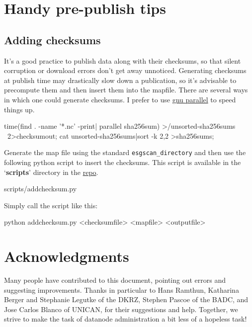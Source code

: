 \section{Handy pre-publish tips}
\subsection{Adding checksums}
It's a good practice to publish data along with their checksums, so that silent corruption or download errors don't get away unnoticed. Generating checksums at publish time may drastically slow down a publication, so it's advisable to precompute them and then insert them into the mapfile. There are several ways in which one could generate checksums. I prefer to use \href{http://www.gnu.org/software/parallel}{gnu parallel} to speed things up.
\begin{verbatimtab}
time(find . -name '*.nc' -print| parallel sha256sum) >/unsorted-sha256sums \
2>checksumout;
cat unsorted-sha256sums|sort -k 2,2 >sha256sums;
\end{verbatimtab}
Generate the map file using the standard \texttt{esgscan\_directory} and then use the following python script to insert the checksums. This script is available in the `\textbf{scripts}' directory in the \href{https://github.com/snic-nsc/datanode-mgr-doc.git}{repo}.
\begin{tiny}
\begin{verbatimtabinput}[4]{scripts/addchecksum.py}
\end{verbatimtabinput}
\end{tiny}
Simply call the script like this:
\begin{verbatimtab}
python addchecksum.py <checksumfile> <mapfile> <outputfile>
\end{verbatimtab}
\section{Acknowledgments}
Many people have contributed to this document, pointing out errors and suggesting improvements. Thanks in particular to Hans Ramthun, Katharina Berger and Stephanie Legutke of the DKRZ, Stephen Pascoe of the BADC, and  Jose Carlos Blanco of UNICAN, for their suggestions and help. Together, we strive to make the task of datanode administration a bit less of a hopeless task!
